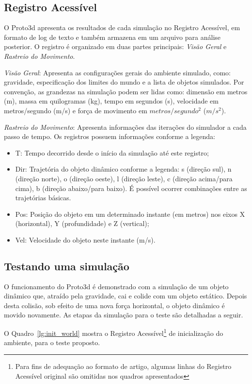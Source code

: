 \documentclass[12pt]{article}
\begin{document}
\subsection{Registro Acessível}
O Proto3d apresenta os resultados de cada simulação no Registro Acessível, em formato de log de texto e também armazena em um arquivo para análise posterior. O registro é organizado em duas partes principais: \emph{Visão Geral} e \emph{Rastreio do Movimento}.

\emph{Visão Geral}: Apresenta as configurações gerais do ambiente simulado, como: gravidade, especificação dos limites do mundo e a lista de objetos simulados. Por convenção, as grandezas na simulação podem ser lidas como: dimensão em metros (m), massa em quilogramas (kg), tempo em segundos (s), velocidade em metros/segundo (m/s) e força de movimento em $metros/segundo^{2}$ ($m/s^{2}$).

\emph{Rastreio do Movimento}: Apresenta informações das iterações do simulador a cada passo de tempo. Os registros possuem informações conforme a legenda:

\begin{itemize}
	\item T: Tempo decorrido desde o início da simulação até este registro;
	\item Dir: Trajetória do objeto dinâmico conforme a legenda: s (direção sul), n (direção norte), o (direção oeste), l (direção leste), c (direção acima/para cima), b (direção abaixo/para baixo). É possível ocorrer combinações entre as trajetórias básicas. 
	\item Pos: Posição do objeto em um determinado instante (em metros) nos eixos X (horizontal), Y (profundidade) e Z (vertical);
	\item Vel: Velocidade do objeto neste instante (m/s).
\end{itemize}

\subsection{Testando uma simulação}
O funcionamento do Proto3d é demonstrado com a simulação de um objeto dinâmico que, atraído pela gravidade, cai e colide com um objeto estático. Depois desta colisão, sob efeito de uma nova força horizontal, o objeto dinâmico é movido novamente. As etapas da simulação para o teste são detalhadas a seguir. 

O Quadro~\ref{lg:init_world} mostra o Registro Acessível\footnote{Para fins de adequação ao formato de artigo, algumas linhas do Registro Acessível original são omitidas nos quadros apresentados} de inicialização do ambiente, para o teste proposto.
\end{document}
